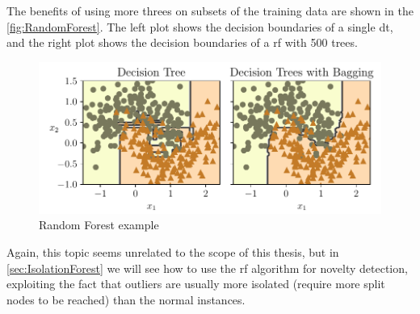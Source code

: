 The benefits of using more threes on subsets of the training data are shown in the \autoref{fig:RandomForest}. The left plot shows the decision boundaries of a single \gls{dt}, and the right plot shows the decision boundaries of a \gls{rf} with 500 trees.

\begin{figure}
    \centering
    \includegraphics{images/MachineLearning/RandomForest.pdf}
    \caption{Random Forest example }
    \label{fig:RandomForest}
\end{figure}

Again, this topic seems unrelated to the scope of this thesis, but in \autoref{sec:IsolationForest} we will see how to use the \gls{rf} algorithm for novelty detection, exploiting the fact that outliers are usually more isolated (require more split nodes to be reached) than the normal instances.
